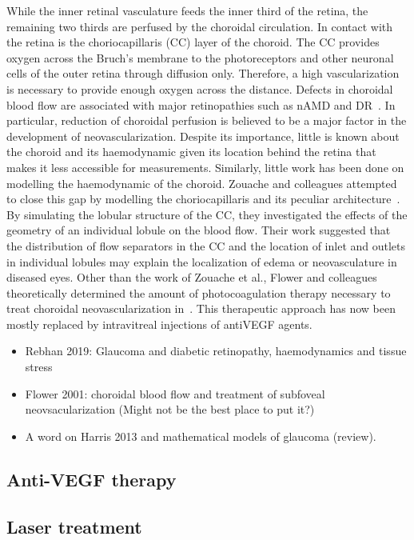 \documentclass[12pt,a4paper]{article}
\begin{document}
While the inner retinal vasculature feeds the inner third of the retina, the remaining two thirds are perfused by the choroidal circulation.
In contact with the retina is the choriocapillaris (CC) layer of the choroid.
The CC provides oxygen across the Bruch's membrane to the photoreceptors and other neuronal cells of the outer retina through diffusion only.
Therefore, a high vascularization is necessary to provide enough oxygen across the distance.
Defects in choroidal blood flow are associated with major retinopathies such as nAMD and DR~\cite{Pemp_2008}.
In particular, reduction of choroidal perfusion is believed to be a major factor in the development of neovascularization.
Despite its importance, little is known about the choroid and its haemodynamic given its location behind the retina that makes it less accessible for measurements. 
Similarly, little work has been done on modelling the haemodynamic of the choroid.
Zouache and colleagues attempted to close this gap by modelling the choriocapillaris and its peculiar architecture~\cite{Zouache_2015}.
By simulating the lobular structure of the CC, they investigated the effects of the geometry of an individual lobule on the blood flow.
Their work suggested that the distribution of flow separators in the CC and the location of inlet and outlets in individual lobules may explain the localization of edema or neovasculature in diseased eyes.
Other than the work of Zouache et al., Flower and colleagues theoretically determined the amount of photocoagulation therapy necessary to treat choroidal neovascularization in~\cite{Flower_2001}.
This therapeutic approach has now been mostly replaced by intravitreal injections of antiVEGF agents.

\begin{itemize}
\item Rebhan 2019: Glaucoma and diabetic retinopathy, haemodynamics and tissue stress
\item Flower 2001: choroidal blood flow and treatment of subfoveal neovsacularization (Might not be the best place to put it?)
\item A word on Harris 2013 and mathematical models of glaucoma (review).
\end{itemize}


\subsection{Anti-VEGF therapy}

\subsection{Laser treatment}

{\normalsize }
\end{document}
